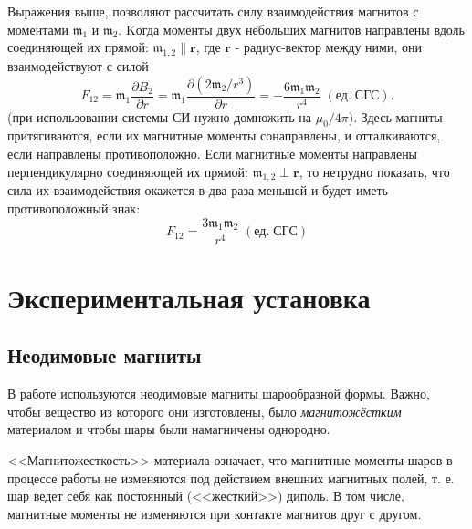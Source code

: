 \documentclass[a4paper, 12pt]{article}
\begin{document}
Выражения выше, позволяют рассчитать силу взаимодействия магнитов с моментами $\mathfrak{m}_1$ и $\mathfrak{m}_2$. Kогда моменты двух небольших магнитов направлены вдоль соединяющей их прямой: $\mathfrak{m}_{1,2} \| \textbf{r}$, где $\textbf{r}$ - радиус-вектор между ними, они взаимодействуют с силой 
\begin{equation}
    \label{6}
    F_{12}= \mathfrak{m}_1 \frac{\partial{B_2}}{\partial{r}} = \mathfrak{m}_1\frac{\partial{(2\mathfrak{m}_2/r^3)}}{\partial{r}} = -\frac{6 \mathfrak{m}_1\mathfrak{m}_2}{r^4} \;(\text{ед}.\; \text{СГС}).
\end{equation}
(при использовании системы СИ нужно домножить на $\mu_0 / 4\pi$). Здесь магниты притягиваются, если их магнитные моменты сонаправлены, и отталкиваются, если направлены противоположно.
Если магнитные моменты направлены перпендикулярно соединяющей их прямой: $\mathfrak{m}_{1,2} \perp \textbf{r}$, то нетрудно показать, что сила их взаимодействия окажется в два раза меньшей и будет иметь противоположный знак: 
\begin{equation}
	F_{12} = \frac{3\mathfrak{m}_1 \mathfrak{m}_2}{r^4}\;(\text{ед}.\; \text{СГС})
\end{equation}

\section{Экспериментальная установка}
\subsection{Неодимовые магниты}
В работе используются неодимовые магниты шарообразной формы. Важно, чтобы вещество из которого они изготовлены, было \textit{магнитожёстким} материалом и чтобы шары были намагничены однородно.


<<Магнитожесткость>> материала означает, что магнитные моменты шаров в процессе работы не изменяются под действием внешних магнитных полей, т. е. шар ведет себя как постоянный (<<жесткий>>) диполь. В том числе, магнитные моменты не изменяются при контакте магнитов друг с другом.
\end{document}
